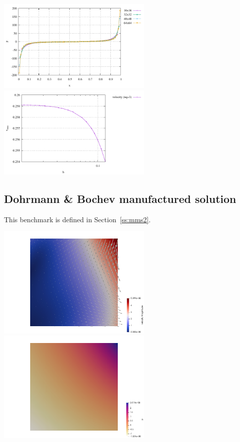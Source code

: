 \begin{center}
\includegraphics[width=7.5cm]{python_codes/fieldstone_80/results/ldc/p_top}
\includegraphics[width=7.5cm]{python_codes/fieldstone_80/results/ldc/vrms}
\end{center}


\subsection*{Dohrmann \& Bochev manufactured solution}

This benchmark is defined in Section~\ref{ss:mms2}.

\begin{center}
\includegraphics[width=7.5cm]{python_codes/fieldstone_80/results/db2d/vel}
\includegraphics[width=7.5cm]{python_codes/fieldstone_80/results/db2d/p}
\end{center}


